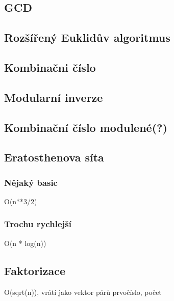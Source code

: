 \documentclass[10pt, a4paper, twoside]{article}
\begin{document}
\subsection{GCD}


\subsection{Rozšířený Euklidův algoritmus}


\subsection{Kombinačni číslo}


\subsection{Modularní inverze}


\subsection{Kombinační číslo modulené(?)}


\subsection{Eratosthenova síta}
\subsubsection{Nějaký basic}
O(n**3/2)


\subsubsection{Trochu rychlejší}
O(n * log(n))


\subsection{Faktorizace}
O(sqrt(n)), vrátí jako vektor párů {prvočíslo, počet}

\end{document}
